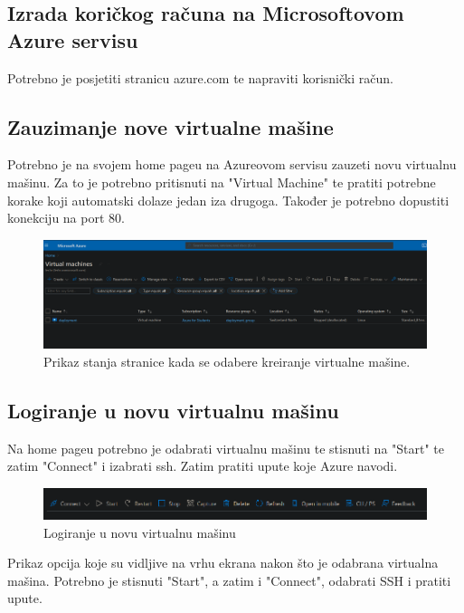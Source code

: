     \subsection{Izrada koričkog računa na Microsoftovom Azure servisu}
    Potrebno je posjetiti stranicu azure.com te napraviti korisnički račun.

    \subsection{Zauzimanje nove virtualne mašine}
    Potrebno je na svojem home pageu na Azureovom servisu zauzeti novu virtualnu mašinu. Za to je potrebno pritisnuti na "Virtual Machine" te pratiti potrebne korake koji automatski dolaze jedan iza drugoga. Također je potrebno dopustiti konekciju na port 80.
    \begin{figure}[H]
        \includegraphics[width=\textwidth]{slike/deploy/create_vm.png} %
        \caption{Prikaz stanja stranice kada se odabere kreiranje virtualne mašine.}
        \label{fig:struktura} %
    \end{figure}

    \subsection{Logiranje u novu virtualnu mašinu}
    Na home pageu potrebno je odabrati virtualnu mašinu te stisnuti na "Start" te zatim "Connect" i izabrati ssh. Zatim pratiti upute koje Azure navodi.
    \begin{figure}[H]
        \includegraphics[width=\textwidth]{slike/deploy/connect.png} %
        \caption{Logiranje u novu virtualnu mašinu}
        \label{fig:struktura} %
    \end{figure}
    Prikaz opcija koje su vidljive na vrhu ekrana nakon što je odabrana virtualna mašina. Potrebno je stisnuti "Start", a zatim i "Connect", odabrati SSH i pratiti upute.


